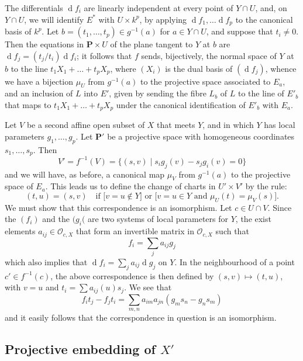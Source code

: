 \documentclass{article}
\newcommand{\scr}[1]{{\mathscr{#1}}}
\newcommand{\PP}{\mathbf{P}}
\newcommand{\dd}{\operatorname{d}\!}
\newcommand{\oldpage}[1]{\marginpar{\footnotesize$\Big\vert$ \textit{p.~#1}}}
\begin{document}
The differentials $\dd f_i$ are linearly independent at every point of $Y\cap U$, and, on $Y\cap U$, we will identify $E^*$ with $U\times k^p$, by applying $\dd f_1,\ldots\dd f_p$ to the canonical basis of $k^p$.
Let $b=(t_1,\ldots,t_p)\in g^{-1}(a)$ for $a\in Y\cap U$, and suppose that $t_i\neq 0$.
Then the equations in $\PP\times U$ of the plane tangent to $Y$ at $b$ are $\dd f_j=(t_j/t_i)\dd f_i$;
it follows that $f$ sends, bijectively, the normal space of $Y$ at $b$ to the line $t_1X_1+\ldots+t_pX_p$, where $(X_i)$ is the dual basis of $(\dd f_j)$, whence we have a bijection $\mu_U$ from $g^{-1}(a)$ to the projective space associated to $E_a$, and an inclusion of $L$ into $E'$, given by sending the fibre $L_b$ of $L$ to the line of $E'_b$ that maps to $t_1X_1+\ldots+t_pX_p$ under the canonical identification of $E'_b$ with $E_a$.

Let $V$ be a second affine open subset of $X$ that meets $Y$, and in which $Y$ has local parameters $g_1,\ldots,g_p$.
Let $\PP'$ be a projective space with homogeneous coordinates $s_1,\ldots,s_p$.
Then
\[
  V' = f^{-1}(V) = \big\{(s,v) \mid s_ig_j(v)-s_jg_i(v)=0\big\}
\]
and we will have, as before, a canonical map $\mu_V$ from $g^{-1}(a)$ to the projective space of $E_a$.
This leads us to define the change of charts in $U'\times V'$ by the rule:
\[
  (t,u) = (s,v)
  \quad\mbox{if [$v=u\not\in Y$] or [$v=u\in Y$ and $\mu_U(t)=\mu_V(s)$].}
\]
We must show that this correspondence is an isomorphism.
Let $c\in U\cap V$.
Since the $(f_i)$ and the $(g_i($ are two systems of local parameters for $Y$, the exist elements $a_{ij}\in\scr{O}_{c,X}$ that form an invertible matrix in $\scr{O}_{c,X}$
\oldpage{127}
such that
\[
  f_i = \sum_j a_{ij}g_j
\]
which also implies that $\dd f_i = \sum_j a_{ij}\dd g_j$ on $Y$.
In the neighbourhood of a point $c'\in f^{-1}(c)$, the above correspondence is then defined by $(s,v)\mapsto(t,u)$, with $v=u$ and $t_i=\sum a_{ij}(u)s_j$.
We see that
\[
  f_it_j-f_jt_i = \sum_{m,n} a_{im}a_{jn}(g_ms_n-g_ns_m)
\]
and it easily follows that the correspondence in question is an isomorphism.


\subsection{Projective embedding of \texorpdfstring{$X'$}{X'}}
\label{subsection12c}
\end{document}
